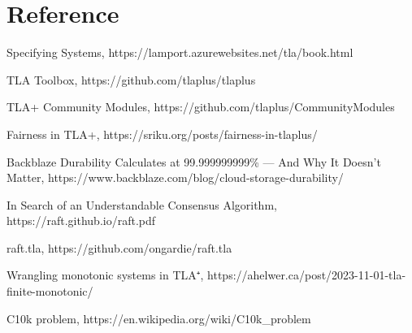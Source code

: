 \chapter{Reference}

\begin{thebibliography}{9}

Specifying Systems, 
https://lamport.azurewebsites.net/tla/book.html

TLA Toolbox,
https://github.com/tlaplus/tlaplus

TLA+ Community Modules,
https://github.com/tlaplus/CommunityModules


\bibitem{}
Fairness in TLA+,
https://sriku.org/posts/fairness-in-tlaplus/

Backblaze Durability Calculates at 99.999999999\% — And Why It Doesn’t Matter,
https://www.backblaze.com/blog/cloud-storage-durability/

In Search of an Understandable Consensus Algorithm,
https://raft.github.io/raft.pdf

raft.tla,
https://github.com/ongardie/raft.tla

Wrangling monotonic systems in TLA⁺,
https://ahelwer.ca/post/2023-11-01-tla-finite-monotonic/

C10k problem,
https://en.wikipedia.org/wiki/C10k\_problem

\end{thebibliography}

